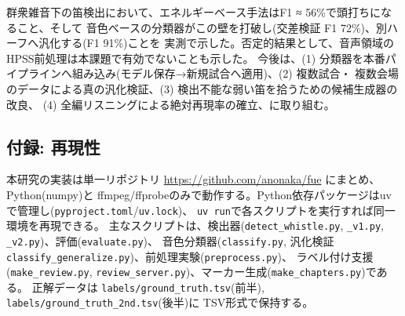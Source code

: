 \documentclass[
  japanese,
]{ltjsarticle}
\begin{document}
群衆雑音下の笛検出において、エネルギーベース手法はF1 ≈
56\%で頭打ちになること、そして
音色ベースの分類器がこの壁を打破し(交差検証 F1
72\%)、別ハーフへ汎化する(F1 91\%)ことを
実測で示した。否定的結果として、音声領域のHPSS前処理は本課題で有効でないことも示した。
今後は、(1)
分類器を本番パイプラインへ組み込み(モデル保存→新規試合へ適用)、(2)
複数試合・ 複数会場のデータによる真の汎化検証、(3)
検出不能な弱い笛を拾うための候補生成器の改良、 (4)
全編リスニングによる絶対再現率の確立、に取り組む。

\subsection{付録: 再現性}\label{ux4ed8ux9332-ux518dux73feux6027}

本研究の実装は単一リポジトリ \url{https://github.com/anonaka/fue}
にまとめ、Python(numpy)と
ffmpeg/ffprobeのみで動作する。Python依存パッケージはuvで管理し(\texttt{pyproject.toml}/\texttt{uv.lock})、
\texttt{uv\ run}で各スクリプトを実行すれば同一環境を再現できる。
主なスクリプトは、検出器(\texttt{detect\_whistle.py}, \texttt{\_v1.py},
\texttt{\_v2.py})、評価(\texttt{evaluate.py})、
音色分類器(\texttt{classify.py}, 汎化検証
\texttt{classify\_generalize.py})、前処理実験(\texttt{preprocess.py})、
ラベル付け支援(\texttt{make\_review.py},
\texttt{review\_server.py})、マーカー生成(\texttt{make\_chapters.py})である。
正解データは \texttt{labels/ground\_truth.tsv}(前半),
\texttt{labels/ground\_truth\_2nd.tsv}(後半)に TSV形式で保持する。
\end{document}
